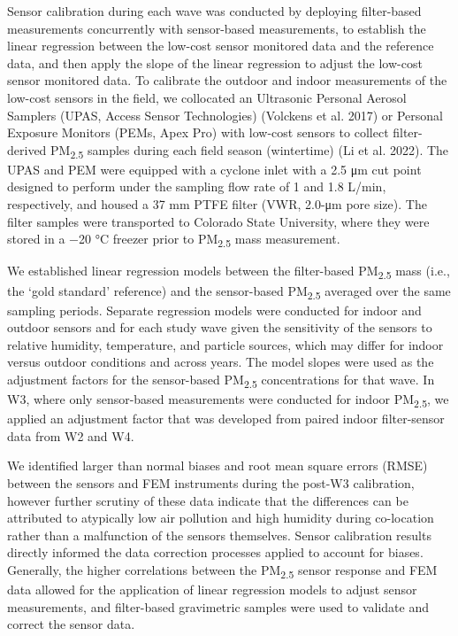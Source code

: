 \documentclass[
  letterpaper,
  DIV=11,
  numbers=noendperiod]{scrartcl}
\begin{document}
Sensor calibration during each wave was conducted by deploying
filter-based measurements concurrently with sensor-based measurements,
to establish the linear regression between the low-cost sensor monitored
data and the reference data, and then apply the slope of the linear
regression to adjust the low-cost sensor monitored data. To calibrate
the outdoor and indoor measurements of the low-cost sensors in the
field, we collocated an Ultrasonic Personal Aerosol Samplers (UPAS,
Access Sensor Technologies) (Volckens et al. 2017) or Personal Exposure
Monitors (PEMs, Apex Pro) with low-cost sensors to collect
filter-derived PM\textsubscript{2.5} samples during each field season
(wintertime) (Li et al. 2022). The UPAS and PEM were equipped with a
cyclone inlet with a 2.5 μm cut point designed to perform under the
sampling flow rate of 1 and 1.8 L/min, respectively, and housed a 37 mm
PTFE filter (VWR, 2.0-μm pore size). The filter samples were transported
to Colorado State University, where they were stored in a −20 °C freezer
prior to PM\textsubscript{2.5} mass measurement.

We established linear regression models between the filter-based
PM\textsubscript{2.5} mass (i.e., the `gold standard' reference) and the
sensor-based PM\textsubscript{2.5} averaged over the same sampling
periods. Separate regression models were conducted for indoor and
outdoor sensors and for each study wave given the sensitivity of the
sensors to relative humidity, temperature, and particle sources, which
may differ for indoor versus outdoor conditions and across years. The
model slopes were used as the adjustment factors for the sensor-based
PM\textsubscript{2.5} concentrations for that wave. In W3, where only
sensor-based measurements were conducted for indoor
PM\textsubscript{2.5}, we applied an adjustment factor that was
developed from paired indoor filter-sensor data from W2 and W4.

We identified larger than normal biases and root mean
square errors (RMSE) between the sensors and FEM instruments during the
post-W3 calibration, however further scrutiny of these data indicate
that the differences can be attributed to atypically low air pollution
and high humidity during co-location rather than a malfunction of the
sensors themselves. Sensor calibration results directly
informed the data correction processes applied to account for biases.
Generally, the higher correlations between the PM\textsubscript{2.5}
sensor response and FEM data allowed for the application of linear
regression models to adjust sensor measurements, and filter-based
gravimetric samples were used to validate and correct the sensor data.
\end{document}
